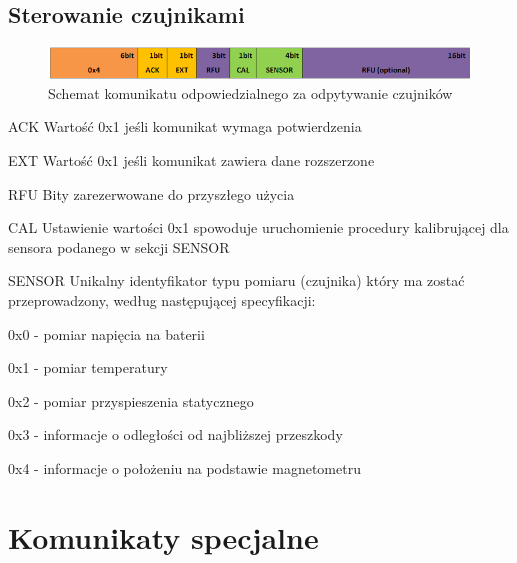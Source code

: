 \subsection{Sterowanie czujnikami}
\begin{figure}[h!] 
 \centering
 \includegraphics[width=\textwidth]{../images/appendix/cmd_0x04.png}
 \caption{Schemat komunikatu odpowiedzialnego za odpytywanie czujników}
 \label{fig:CMD_0x04}
\end{figure}

\begin{basedescript}{\desclabelstyle{\pushlabel}\desclabelwidth{25mm}}
\setlength{\parsep}{0pt}
\setlength{\itemsep}{0mm}
\setlength{\parskip}{0pt}
\item[ACK]
	Wartość 0x1 jeśli komunikat wymaga potwierdzenia
\item[EXT] 
	Wartość 0x1 jeśli komunikat zawiera dane rozszerzone
\item[RFU] 
	Bity zarezerwowane do przyszłego użycia
\item[CAL] 
	Ustawienie wartości 0x1 spowoduje uruchomienie procedury kalibrującej
	dla sensora podanego w sekcji SENSOR
\item[SENSOR] 
	Unikalny identyfikator typu pomiaru (czujnika) który ma zostać przeprowadzony,
	według następującej specyfikacji:
	\begin{desc}
	\item[0x0] - pomiar napięcia na baterii
	\item[0x1] - pomiar temperatury
	\item[0x2] - pomiar przyspieszenia statycznego
	\item[0x3] - informacje o odległości od najbliższej przeszkody
	\item[0x4] - informacje o położeniu na podstawie magnetometru
	\end{desc}
\end{basedescript}


\section{Komunikaty specjalne}